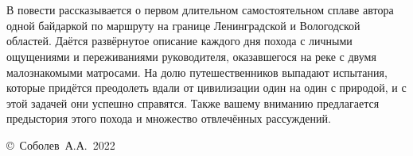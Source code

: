 \chapter*{}

В повести рассказывается о первом длительном самостоятельном сплаве автора одной байдаркой по маршруту  на границе Ленинградской и Вологодской областей. Даётся развёрнутое описание каждого дня похода с личными ощущениями и переживаниями руководителя, оказавшегося на реке с двумя малознакомыми матросами. На долю путешественников выпадают испытания, которые придётся преодолеть вдали от цивилизации один на один с природой, и с этой задачей они успешно справятся. Также вашему вниманию предлагается предыстория этого похода и множество отвлечённых рассуждений.

\vspace{\fill}
\begin{flushright}
	\copyright~Соболев~А.А.~2022
\end{flushright}